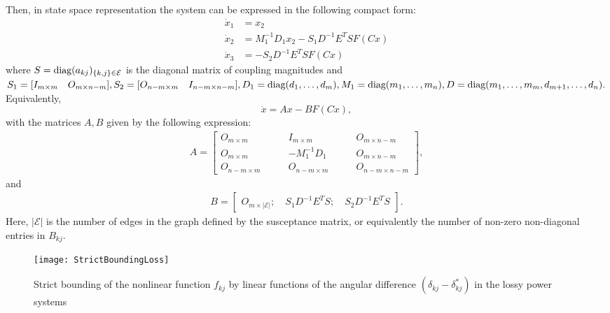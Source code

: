 \documentclass[final]{IEEEtran}
\begin{document}
Then, in state space representation the system can be expressed in
the following compact form:
\begin{align}
\dot{x}_1 &=x_2 \nonumber \\
\dot{x}_2 &=M_1^{-1}D_1x_2-S_1D^{-1}E^TSF(Cx)  \\
\dot{x}_3 &= -S_2D^{-1}E^TS F(Cx) \nonumber
\end{align}
where $S=\emph{\emph{diag}}(a_{kj})_{\{k,j\}\in \mathcal{E}}$ is
the diagonal matrix of  coupling magnitudes and $S_1=[I_{m\times
m}\quad O_{m\times n-m}], S_2=[O_{n-m\times m} \quad I_{n-m\times
n-m}], D_1=\emph{\emph{diag}}(d_1,\dots,d_m),
M_1=\emph{\emph{diag}}(m_1,\dots,m_n),
D=\emph{\emph{diag}}(m_1,\dots,m_m,d_{m+1},\dots,d_n).$
Equivalently,
\begin{equation}\label{eq.Bilinear}
 \dot x = A x - B F(C x),
\end{equation}
with the matrices $A,B$ given by the following expression:
\begin{align*}
A=\left[
        \begin{array}{ccccc}
          O_{m \times m} \qquad & I_{m \times m}  \qquad & O_{m \times n-m}\\
          O_{m \times m} \qquad & -M_1^{-1}D_1 \qquad & O_{m \times n-m} \\
          O_{n-m \times m} \qquad &O_{n-m \times m} \qquad & O_{n-m \times n-m}
        \end{array}
      \right],
\end{align*}
and
\begin{align}
\label{eq.Bmatrix}
 B= \left[
        \begin{array}{ccccc}
          O_{m \times |\mathcal{E}|}; \quad
          S_1D^{-1}E^TS; \quad
          S_2D^{-1}E^TS
        \end{array}
      \right].
\end{align}
Here, $|\mathcal{E}|$ is the number of edges in the graph defined
by the susceptance matrix, or equivalently the number of non-zero
non-diagonal entries in $B_{kj}$.

\begin{figure}
\centering
\texttt{[image: StrictBoundingLoss]}
\caption{Strict bounding of the nonlinear function $f_{kj}$ by
linear functions of the angular difference
$(\delta_{kj}-\delta^*_{kj})$ in the lossy power systems}
\label{fig.StrictBoundingLoss}
\end{figure}
\end{document}
